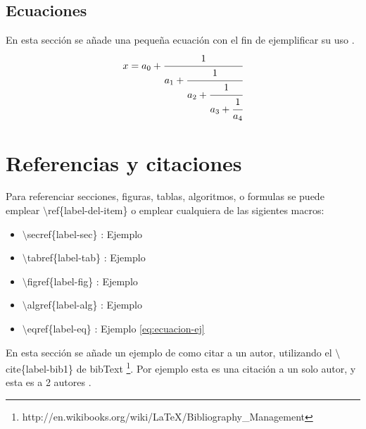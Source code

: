 \subsection{Ecuaciones}
En esta sección se añade una pequeña ecuación con el fin de ejemplificar su
uso  .
\begin{equation}\label{eq:ecuacion-ej}
  x = a_0 + \cfrac{1}{a_1
          + \cfrac{1}{a_2
          + \cfrac{1}{a_3 + \cfrac{1}{a_4} } } }
\end{equation}

\section{Referencias y citaciones}
Para referenciar secciones, figuras, tablas, algoritmos, o formulas se puede
emplear $\setminus$ref\{label-del-item\} o emplear cualquiera de las sigientes macros:


\begin{itemize}
\item $\setminus$secref\{label-sec\} : Ejemplo 
\item $\setminus$tabref\{label-tab\} : Ejemplo 
\item $\setminus$figref\{label-fig\} : Ejemplo 
\item $\setminus$algref\{label-alg\} : Ejemplo 
\item $\setminus$eqref\{label-eq\} : Ejemplo \eqref{eq:ecuacion-ej}
\end{itemize}

En esta sección se añade un ejemplo de como citar a un autor, utilizando
el $\setminus$cite\{label-bib1\} de bibText \footnote{http://en.wikibooks.org/wiki/LaTeX/Bibliography\_Management}.
Por ejemplo esta es una citación \cite{griffiths1997learning} a un solo
autor, y esta es a 2 autores \cite{griffiths1997learning, lamport1985i1}.

